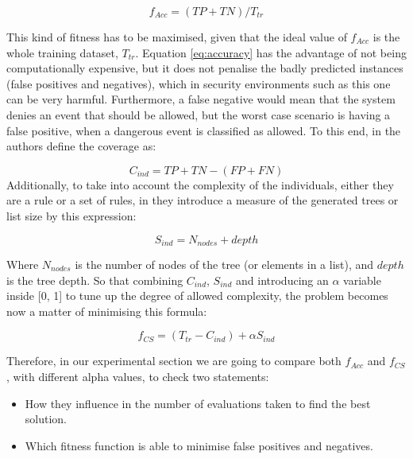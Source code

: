 \documentclass[runningheads]{llncs}
\begin{document}
\begin{equation}
\label{eq:accuracy}
f_{Acc} = (TP + TN) / T_{tr}
\end{equation}

This kind of fitness has to be maximised, given that the ideal value
of $f_{Acc}$ is the whole training dataset, $T_{tr}$. Equation \ref{eq:accuracy} has the 
advantage of not being computationally expensive, but it does not
penalise the badly predicted instances (false positives and
negatives), which in security environments such as this one can be
very harmful. Furthermore, a false negative would mean that the system denies an event that should be allowed, but the worst case scenario is having a false positive, when a dangerous event is classified as allowed.
To this end, in \cite{witten2005data} the authors define the coverage as:

\begin{equation}
\label{eq:coverage}
C_{ind} = TP + TN - (FP + FN)
\end{equation}
Additionally, to take into account the complexity of the individuals,
either they are a rule or a set of rules, in \cite{witten2005data}
they introduce a measure of the generated trees or list size by this
expression: 

\begin{equation}
S_{ind} = N_{nodes} + depth
\end{equation}

Where $N_{nodes}$ is the number of nodes of the tree (or elements in a list), and $depth$ is the tree depth. So that combining $C_{ind}$, $S_{ind}$ and introducing an $\alpha$ variable inside [0, 1] to tune up the degree of allowed complexity, the problem becomes now a matter of minimising this formula:

\begin{equation}
\label{eq:complexFitness}
f_{CS} = (T_{tr} - C_{ind}) + \alpha S_{ind}
\end{equation}

Therefore, in our experimental section we are going to compare both
$f_{Acc}$ and $f_{CS}$, with different  alpha values, to check two statements:

\begin{itemize}
	\item How they influence in the number of evaluations taken to find the best solution.
	\item Which fitness function is able to minimise false
          positives and negatives.
\end{itemize}
\end{document}
